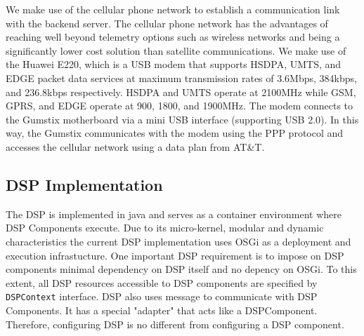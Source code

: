 \documentclass[conference]{IEEEtran}
\begin{document}
 

We make use of the cellular phone network to establish a communication
link with the backend server. The cellular phone network has the
advantages of reaching well beyond telemetry options such as wireless
networks and being a significantly lower cost solution than satellite
communications. We make use of the Huawei E220, which is a USB
modem that supports HSDPA, UMTS, and EDGE packet data services at
maximum transmission rates of 3.6Mbps, 384kbps, and 236.8kbps
respectively.  HSDPA and UMTS operate at 2100MHz while GSM, GPRS, and
EDGE operate at 900, 1800, and 1900MHz. The modem connects to the
Gumstix motherboard via a mini USB interface (supporting USB 2.0). In this
way, the Gumstix communicates with the modem using the PPP protocol and
accesses the cellular network using a data plan from AT\&T.



\subsection{DSP Implementation}

The DSP is implemented in java and serves as a container environment where 
DSP Components execute. Due to its micro-kernel, modular and dynamic characteristics 
the current DSP implementation uses OSGi \cite{osgi} as a deployment and execution 
infrastucture. One important DSP requirement is to impose on DSP components minimal 
dependency on DSP itself and no depency on OSGi. To this extent, all DSP resources
accessible to DSP components are specified by \texttt{DSPContext} interface.
DSP also uses message to communicate with DSP Components. It has a special "adapter"
that acts like a DSPComponent. Therefore, configuring DSP is no different from configuring
a DSP component.
\end{document}
